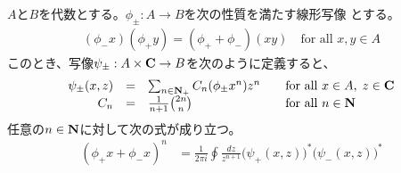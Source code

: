{	\begin{proposition}[代数から代数]\label{prop:代数から代数} %
		$A$と$B$を代数とする。$\phi_\pm:A\to B$を次の性質を満たす線形写像
		とする。
		\begin{equation*}\begin{split}
			(\phi_-x)(\phi_+y) = (\phi_+ + \phi_-)(xy)
			\quad\text{for all } x,y\in A
		\end{split}\end{equation*}
		このとき、写像$\psi_\pm:A\times\mathbf{C}\to B$を次のように定義すると、
		\begin{equation*}\begin{array}{rcll}
			\psi_\pm(x,z) &=& \sum_{n\in\mathbf{N}_+} C_n(\phi_\pm x^n)z^n
			& \quad\text{for all } x\in A,\; z\in\mathbf{C} \\
			C_n &=& \frac{1}{n+1}\binom{2n}{n} &\quad\text{for all } n\in\mathbf{N} \\
		\end{array}\end{equation*}
		任意の$n\in\mathbf{N}$に対して次の式が成り立つ。
		\begin{equation*}\begin{split}
			(\phi_+x + \phi_-x)^n &= \frac{1}{2\pi i} \oint \frac{dz}{z^{n+1}} 
				\bigl(\psi_+(x,z)\bigr)^*\bigl(\psi_-(x,z)\bigr)^* \\
		\end{split}\end{equation*}
	\end{proposition} %

}
